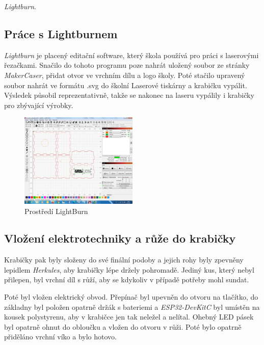 \textit{Lightburn}\cite{lightburn}.

\subsection{Práce s Lightburnem}
\textit{Lightburn} je placený editační software, který škola používá pro práci s laserovými řezačkami. 
Snačilo do tohoto programu poze nahrát uložený soubor ze stránky \textit{MakerCaser}\cite{makercase}, přidat otvor ve vrchním dílu a logo školy. Poté stačilo upravený soubor nahrát ve formátu .svg do školní Laserové tiskárny a krabičku vypálit. Výsledek působil reprezentativně, takže se nakonec na laseru vypálily i krabičky pro zbývající výrobky. 



\begin{figure}[htbp]
	\centering
	\includegraphics[width=0.5\textwidth]{img/06 zakl/LightBurn_ukazka.jpg}
	\caption{Prostředí LightBurn}
\end{figure}

\subsection{Vložení elektrotechniky a růže do krabičky}
Krabičky pak byly složeny do své finální podoby a jejich rohy byly zpevněny lepidlem \textit{Herkules}, aby krabičky lépe držely pohromadě. Jediný kus, který nebyl přilepen, byl vrchní díl s růží, aby se kdykoliv v případě potřeby mohl sundat. 


Poté byl vložen elektrický obvod. Přepínač byl upevněn do otvoru na tlačítko, do základny byl položen opatrně držák s bateriemi a \textit{ESP32-DevKitC} byl umístěn na kousek polystyrenu, aby v krabičce jen tak neležel a nelítal. 
Ohebný LED pásek byl opatrně ohnut do obloučku a vložen do otvoru v růži. Poté bylo opatrně přiděláno vrchní víko a bylo hotovo. 

